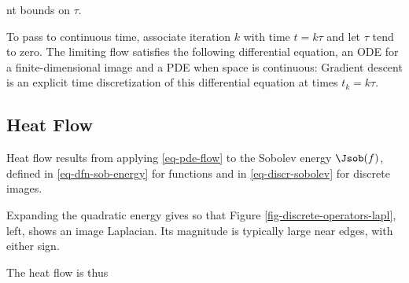 nt bounds on $\tau$.

To pass to continuous time, associate iteration $k$ with time $t=k\tau$ and let $\tau$ tend to zero. The limiting flow
satisfies the following differential equation, an ODE for a finite-dimensional image and a PDE when space is continuous:
Gradient descent is an explicit time discretization of this differential equation at times $t_k = k  \tau$.


                                                                      
\subsection{Heat Flow}

Heat flow results from applying \eqref{eq-pde-flow} to the Sobolev energy $\Jsob(f)$, defined in \eqref{eq-dfn-sob-energy} for functions and in \eqref{eq-discr-sobolev} for discrete images.

Expanding the quadratic energy gives
so that 
Figure \ref{fig-discrete-operators-lapl}, left, shows an image Laplacian. Its magnitude is typically large near edges, with either sign.

The heat flow is thus 


